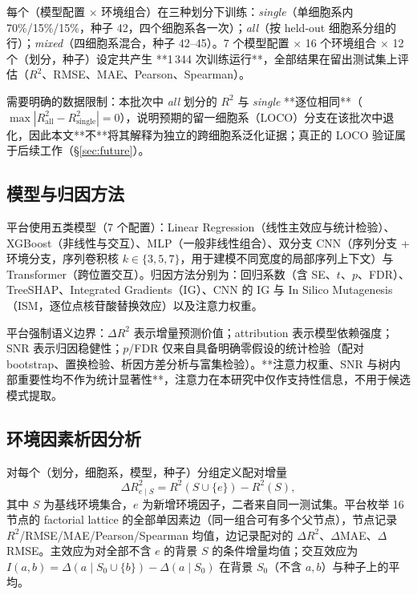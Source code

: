 每个（模型配置 $\times$ 环境组合）在三种划分下训练：\emph{single}（单细胞系内 70\%/15\%/15\%，种子 42，四个细胞系各一次）；\emph{all}（按 held-out 细胞系分组的行）；\emph{mixed}（四细胞系混合，种子 42--45）。7 个模型配置 $\times$ 16 个环境组合 $\times$ 12 个（划分，种子）设定共产生 **1\,344 次训练运行**，全部结果在留出测试集上评估（$R^{2}$、RMSE、MAE、Pearson、Spearman）。

需要明确的数据限制：本批次中 \emph{all} 划分的 $R^{2}$ 与 \emph{single} **逐位相同**（$\max|R^{2}_{\text{all}}-R^{2}_{\text{single}}|=0$），说明预期的留一细胞系（LOCO）分支在该批次中退化，因此本文**不**将其解释为独立的跨细胞系泛化证据；真正的 LOCO 验证属于后续工作（\S\ref{sec:future}）。

\subsection{模型与归因方法}

平台使用五类模型（7 个配置）：Linear Regression（线性主效应与统计检验）、XGBoost（非线性与交互\citep{Chen2016KDD}）、MLP（一般非线性组合）、双分支 CNN（序列分支 + 环境分支，序列卷积核 $k\in\{3,5,7\}$，用于建模不同宽度的局部序列上下文）与 Transformer（跨位置交互\citep{Vaswani2017NeurIPS}）。归因方法分别为：回归系数（含 SE、$t$、$p$、FDR）、TreeSHAP\citep{Lundberg2017NeurIPS}、Integrated Gradients（IG）\citep{Sundararajan2017ICML}、CNN 的 IG 与 In Silico Mutagenesis（ISM，逐位点核苷酸替换效应）以及注意力权重。

平台强制语义边界：$\Delta R^{2}$ 表示增量预测价值；attribution 表示模型依赖强度；SNR 表示归因稳健性；$p$/FDR 仅来自具备明确零假设的统计检验（配对 bootstrap、置换检验、析因方差分析与富集检验）。**注意力权重、SNR 与树内部重要性均不作为统计显著性**，注意力在本研究中仅作支持性信息，不用于候选模式提取。

\subsection{环境因素析因分析}

对每个（划分，细胞系，模型，种子）分组定义配对增量
\begin{equation}
\Delta R^{2}_{e \mid S} = R^{2}(S \cup \{e\}) - R^{2}(S),
\end{equation}
其中 $S$ 为基线环境集合，$e$ 为新增环境因子，二者来自同一测试集。平台枚举 16 节点的 factorial lattice 的全部单因素边（同一组合可有多个父节点），节点记录 $R^{2}$/RMSE/MAE/Pearson/Spearman 均值，边记录配对的 $\Delta R^{2}$、$\Delta$MAE、$\Delta$RMSE。主效应为对全部不含 $e$ 的背景 $S$ 的条件增量均值；交互效应为 $I(a,b)=\Delta(a\mid S_0\cup\{b\})-\Delta(a\mid S_0)$ 在背景 $S_0$（不含 $a,b$）与种子上的平均。

